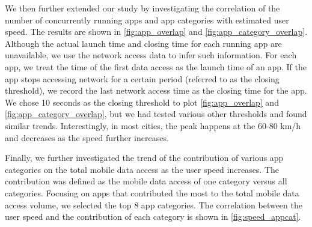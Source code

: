 
We then further extended our study by investigating the correlation of the number of concurrently running apps and app categories with estimated user speed. The results are shown in \autoref{fig:app_overlap} and \autoref{fig:app_category_overlap}. %
Although the actual launch time and closing time for each running app are unavailable, we use the network access data to infer such information. For each app, we treat the time of the first data access as the launch time of an app. If the app stops accessing network for a certain period (referred to as the closing threshold), we record the last network access time as the closing time for the app. We chose 10 seconds as the closing threshold to plot
\autoref{fig:app_overlap} and \autoref{fig:app_category_overlap}, 
but we had tested various other thresholds and found similar trends. Interestingly, in most cities, the peak happens at the 60-80 km/h and decreases as the speed further increases. 


Finally, we further investigated the trend of the contribution of various app categories on the total mobile data access as the user speed increases.
The contribution was defined as the mobile data access of one category versus all categories.
Focusing on apps that contributed the most to the total mobile data access volume,
we selected the top 8 app categories.
The correlation between the user speed and the contribution of each category is shown in \autoref{fig:speed_appcat}.

